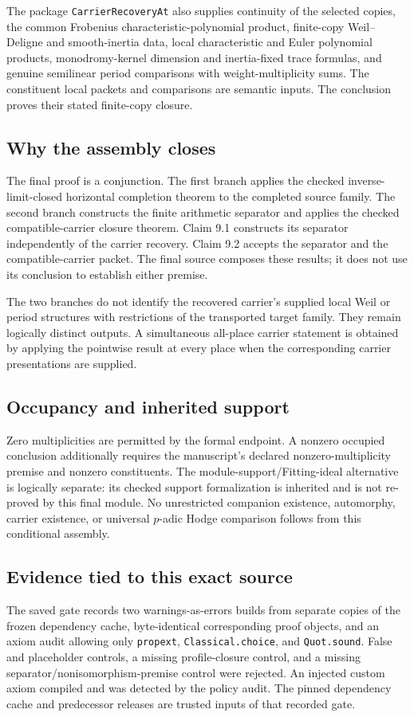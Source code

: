 The package \nolinkurl{CarrierRecoveryAt} also supplies continuity of the selected copies, the common Frobenius characteristic-polynomial product, finite-copy Weil--Deligne and smooth-inertia data, local characteristic and Euler polynomial products, monodromy-kernel dimension and inertia-fixed trace formulas, and genuine semilinear period comparisons with weight-multiplicity sums. The constituent local packets and comparisons are semantic inputs. The conclusion proves their stated finite-copy closure.

\subsection{Why the assembly closes}
The final proof is a conjunction. The first branch applies the checked inverse-limit-closed horizontal completion theorem to the completed source family. The second branch constructs the finite arithmetic separator and applies the checked compatible-carrier closure theorem. Claim 9.1 constructs its separator independently of the carrier recovery. Claim 9.2 accepts the separator and the compatible-carrier packet. The final source composes these results; it does not use its conclusion to establish either premise.

The two branches do not identify the recovered carrier's supplied local Weil or period structures with restrictions of the transported target family. They remain logically distinct outputs. A simultaneous all-place carrier statement is obtained by applying the pointwise result at every place when the corresponding carrier presentations are supplied.

\subsection{Occupancy and inherited support}
Zero multiplicities are permitted by the formal endpoint. A nonzero occupied conclusion additionally requires the manuscript's declared nonzero-multiplicity premise and nonzero constituents. The module-support/Fitting-ideal alternative is logically separate: its checked support formalization is inherited and is not re-proved by this final module. No unrestricted companion existence, automorphy, carrier existence, or universal $p$-adic Hodge comparison follows from this conditional assembly.

\subsection{Evidence tied to this exact source}
The saved gate records two warnings-as-errors builds from separate copies of the frozen dependency cache, byte-identical corresponding proof objects, and an axiom audit allowing only \nolinkurl{propext}, \nolinkurl{Classical.choice}, and \nolinkurl{Quot.sound}. False and placeholder controls, a missing profile-closure control, and a missing separator/nonisomorphism-premise control were rejected. An injected custom axiom compiled and was detected by the policy audit. The pinned dependency cache and predecessor releases are trusted inputs of that recorded gate.

